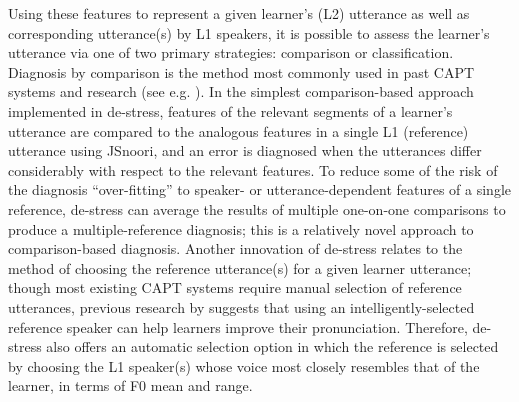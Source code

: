 \documentclass[11pt,a4paper,onecolumn]{article}
\newcommand{\TODO}[1]{{\color{red}\textbf{[TODO #1]}}}
\begin{document}
	
	Using these features to represent a given learner's (L2) utterance as well as corresponding utterance(s) by L1 speakers, it is possible to assess the learner's utterance via one of two primary strategies: comparison or classification. 
	Diagnosis by comparison is the method most commonly used in past CAPT systems and research (see e.g. \cite{Eskenazi2009,Bonneau2011,Delmonte2011}).
	In the simplest comparison-based approach implemented in de-stress, features of the relevant segments of a learner's utterance are compared to the analogous features in a single L1 (reference) utterance using JSnoori, and an error is diagnosed when the utterances differ considerably with respect to the relevant features. 
	To reduce some of the risk of the diagnosis ``over-fitting'' to speaker- or utterance-dependent features of a single reference, de-stress can average the results of multiple one-on-one comparisons to produce a multiple-reference diagnosis; this is a relatively novel approach to comparison-based diagnosis.
	Another innovation of de-stress relates to the method of choosing the reference utterance(s) for a given learner utterance; though most existing CAPT systems 
	require manual selection of reference utterances, previous research by \textcite{Probst2002} suggests that using an intelligently-selected reference speaker can help learners improve their pronunciation. Therefore, de-stress also offers an automatic selection option in which the reference is selected by choosing the L1 speaker(s) whose voice most closely resembles that of the learner, in terms of F0 mean and range.
	
\end{document}
